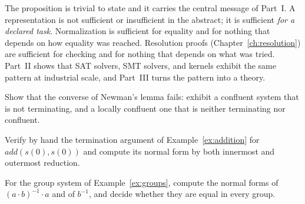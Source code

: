 The proposition is trivial to state and it carries the central message of Part~I. A representation is not sufficient or insufficient in the abstract; it is sufficient \emph{for a declared task}. Normalization is sufficient for equality and for nothing that depends on how equality was reached. Resolution proofs (Chapter~\ref{ch:resolution}) are sufficient for checking and for nothing that depends on what was tried. Part~II shows that SAT solvers, SMT solvers, and kernels exhibit the same pattern at industrial scale, and Part~III turns the pattern into a theory.

\begin{exercise}
Show that the converse of Newman's lemma fails: exhibit a confluent system that is not terminating, and a locally confluent one that is neither terminating nor confluent.
\end{exercise}

\begin{exercise}
Verify by hand the termination argument of Example~\ref{ex:addition} for $\mathit{add}(s(0),s(0))$ and compute its normal form by both innermost and outermost reduction.
\end{exercise}

\begin{exercise}
For the group system of Example~\ref{ex:groups}, compute the normal forms of $(a\cdot b)^{-1}\cdot a$ and of $b^{-1}$, and decide whether they are equal in every group.
\end{exercise}
